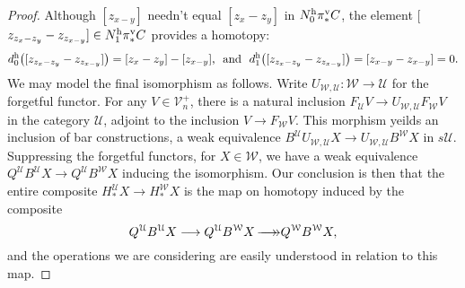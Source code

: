 \documentclass[11pt]{amsart}
\theoremstyle{plain}
\theoremstyle{definition}
\renewcommand{\to}{\longrightarrow}
\newcommand{\calW}{\mathcal{W}}
\newcommand{\calU}{\mathcal{U}}
\newcommand{\calV}{\mathcal{V}}
\theoremstyle{plain}
\newcommand{\vect}[2]{\calV^{#1}_{#2}}
\newcommand{\epi}{{\,\makebox[0cm][l]{\ensuremath\to}\to}}
\begin{document}
\begin{Composite functor spectral sequences}
\begin{proof}
Although $[z_{x-y}]$ needn't equal $[z_{x}-z_{y}]$ in $N_0^\textup{h}\pi_*^\textup{v}C$, the element [$z_{z_{x}-z_{y}}-z_{z_{x-y}}]\in N_1^\textup{h}\pi_*^\textup{v}C$ provides a homotopy:
%
\[d_0^\textup{h}\!\left([z_{z_{x}-z_{y}}-z_{z_{x-y}}]\right)=[z_x-z_y]-[z_{x-y}]\textup{, \  and \ }d_1^\textup{h}\!\left([z_{z_{x}-z_{y}}-z_{z_{x-y}}]\right)=[z_{{x}-{y}}-z_{{x}-{y}}]=0.\]
We may model the final isomorphism as follows. Write $U_{\calW,\calU}:\calW\to\calU$ for the forgetful functor. For any $V\in\vect{+}{n}$, there is a natural inclusion $F_{\calU}V\to U_{\calW,\calU} F_{\calW}V$ in the category  $\calU$, adjoint to the inclusion $V\to F_{\calW}V$. This morphism yeilds an inclusion of bar constructions, a weak equivalence $B^{\calU}U_{\calW,\calU}X\to U_{\calW,\calU}B^{\calW}X$ in $s\calU$. Suppressing the forgetful functors, for $X\in\calW$, we have a weak equivalence $Q^{\calU}B^{\calU}X\to Q^{\calU}B^{\calW}X$ inducing the isomorphism. Our conclusion is then that the entire composite $H_*^{\calU}X\to H_*^{\calW}X$ is the map on homotopy induced by the composite 
\[Q^{\calU}B^{\calU}X\to Q^{\calU}B^{\calW}X \epi Q^{\calW}B^{\calW}X,\]
and the operations we are considering are easily understood in relation to this map.
\end{proof}


\end{Composite functor spectral sequences}
\end{document}
